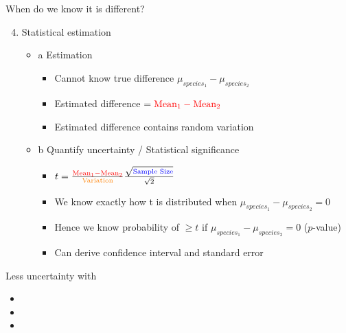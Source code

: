 \documentclass[10pt]{beamer}\usepackage[]{graphicx}\usepackage[]{color}
\begin{document}
\begin{frame}[fragile]{When do we know it is different?}

\begin{enumerate}
  \setcounter{enumi}{3}
  \item Statistical estimation
  \begin{itemize}
    \item a Estimation
      \begin{itemize}
        \item Cannot know true difference $\mu_{species_1} - \mu_{species_2}$
        \item Estimated difference $= \color{red}{\text{Mean}_1 - \text{Mean}_2 }$
        \item Estimated difference contains random variation
      \end{itemize}
    \item b Quantify uncertainty / Statistical significance
      \begin{itemize}
        \item $
      t = \frac{\color{red}{\text{Mean}_1 - \text{Mean}_2}}{\text{\color{orange}Variation}}
      \frac{\sqrt{{\text{\color{blue}{Sample Size}}}}}{\sqrt{2}}
      $
        \item We know exactly how t is distributed when $\mu_{species_1} - \mu_{species_2} = 0$
        \item Hence we know probability of $\geq t$ if $\mu_{species_1} - \mu_{species_2} = 0$ ($p$-value)
        \item Can derive confidence interval and standard error
      \end{itemize}
  \end{itemize}
\end{enumerate}

\pause
Less uncertainty with
  \begin{itemize}
    \item \color{red}{Larger absolute difference}
    \item \color{orange}{Smaller variability}
    \item \color{blue}{Larger sample size}
  \end{itemize}


\end{frame}
  
\end{document}
